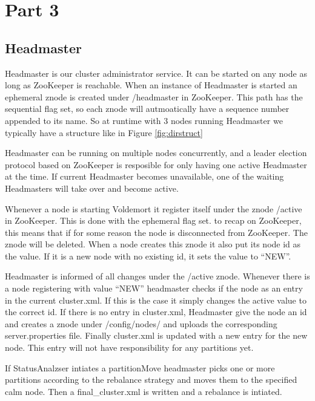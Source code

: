 \section{Part 3}
\subsection{Headmaster}

Headmaster is our cluster administrator service. It can be started on any node as long as ZooKeeper is reachable. When an instance of Headmaster is started an ephemeral znode is created under /headmaster in ZooKeeper. This path has the sequential flag set, so each znode will autmoatically have a sequence number appended to its name. So at runtime with 3 nodes running Headmaster we typically have a structure like in Figure \ref{fig:dirstruct}

Headmaster can be running on multiple nodes concurrently, and a leader election protocol based on ZooKeeper is resposible for only having one active Headmaster at the time. If current Headmaster becomes unavailable, one of the waiting Headmasters will take over and become active. 

Whenever a node is starting Voldemort it register itself under the znode /active in ZooKeeper. This is done with the ephemeral flag set. to recap on ZooKeeper, this means that if for some reason the node is disconnected from ZooKeeper. The znode will be deleted. When a node creates this znode it also put its node id as the value. If it is a new node with no existing id, it sets the value to ``NEW''. 

Headmaster is informed of all changes under the /active znode. Whenever there is a node registering with value ``NEW'' headmaster checks if the node as an entry in the current cluster.xml. If this is the case it simply changes the active value to the correct id. If there is no entry in cluster.xml, Headmaster give the node an id and creates a znode under /config/nodes/ and uploads the corresponding server.properties file. Finally cluster.xml is updated with a new entry for the new node. This entry will not have responsibility for any partitions yet.

If StatusAnalzser intiates a partitionMove headmaster picks one or more partitions according to the rebalance strategy and moves them to the specified calm node. Then a final\_cluster.xml is written and a rebalance is intiated.



